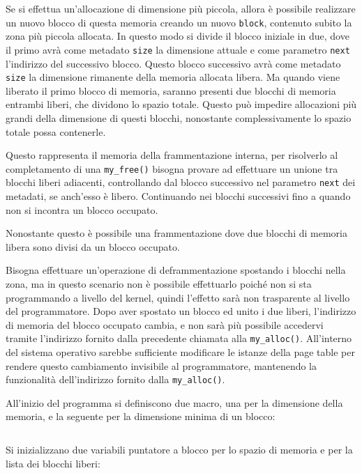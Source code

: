 \documentclass{article}
\numberwithin{equation}{subsection}
\begin{document}
Se si effettua un'allocazione di dimensione più piccola, allora è possibile realizzare un nuovo 
blocco di questa memoria creando un nuovo \verb|block|, contenuto subito la zona più piccola 
allocata. In questo modo si divide il blocco iniziale in due, dove il primo avrà come metadato \verb|size| la dimensione attuale e come parametro \verb|next| l'indirizzo del successivo blocco. Questo blocco successivo avrà come metadato \verb|size| la dimensione rimanente della 
memoria allocata libera. 
Ma quando viene liberato il primo blocco di memoria, saranno presenti due blocchi di memoria 
entrambi liberi, che dividono lo spazio totale. Questo può impedire allocazioni più grandi della 
dimensione di questi blocchi, nonostante complessivamente lo spazio totale possa contenerle. 

Questo rappresenta il memoria della frammentazione interna, per risolverlo al completamento di 
una \verb|my_free()| bisogna provare ad effettuare un unione tra blocchi liberi adiacenti, controllando dal blocco successivo nel parametro \verb|next| dei metadati, se anch'esso è libero. Continuando nei blocchi successivi fino a quando non si incontra un blocco occupato. 

Nonostante questo è possibile una frammentazione dove due blocchi di memoria libera sono divisi 
da un blocco occupato. 

Bisogna effettuare un'operazione di deframmentazione spostando i blocchi nella zona, ma in questo 
scenario non è possibile effettuarlo poiché non si sta programmando a livello del kernel, quindi 
l'effetto sarà non trasparente al livello del programmatore. Dopo aver spostato un blocco 
ed unito i due liberi, l'indirizzo di memoria del blocco occupato cambia, e non sarà più possibile 
accedervi tramite l'indirizzo fornito dalla precedente chiamata alla \verb|my_alloc()|. All'interno del sistema operativo sarebbe sufficiente modificare le istanze della page table per 
rendere questo cambiamento invisibile al programmatore, mantenendo la funzionalità dell'indirizzo 
fornito dalla \verb|my_alloc()|. 


All'inizio del programma si definiscono due macro, una per la dimensione della memoria, e la seguente per la dimensione minima di un blocco: 
\inputminted[firstline=7,lastline=8]{c}{./"Esercitazione del 19-11-24"/domanda4.c}
Si inizializzano due variabili puntatore a blocco per lo spazio di memoria e per la lista 
dei blocchi liberi:
\inputminted[firstline=27,lastline=28]{c}{./"Esercitazione del 19-11-24"/domanda4.c}
\end{document}
